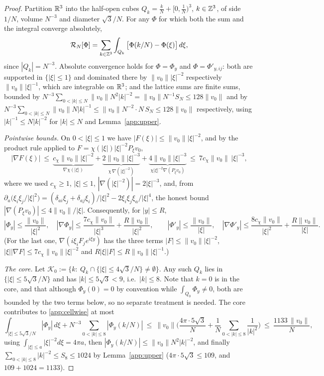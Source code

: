 \begin{proof}
Partition $\mathbb R^3$ into the half-open cubes
$Q_k=\frac kN+[0,\frac1N)^3$, $k\in\mathbb Z^3$, of side $1/N$, volume
$N^{-3}$ and diameter $\sqrt3/N$. For any $\Phi$ for which both the sum
and the integral converge absolutely,
\begin{equation}\label{app:cellwise}
\mathcal R_N[\Phi]=\sum_{k\in\mathbb Z^3}\int_{Q_k}
\big[\Phi(k/N)-\Phi(\xi)\big]\,d\xi ,
\end{equation}
since $|Q_k|=N^{-3}$. Absolute convergence holds for
$\Phi=\Phi_y$ and $\Phi=\Phi'_{y,ij}$: both are supported in
$\{|\xi|\le1\}$ and dominated there by $\|v_0\||\xi|^{-2}$ respectively
$\|v_0\||\xi|^{-1}$, which are integrable on $\mathbb R^3$; and the lattice
sums are finite sums, bounded by
$N^{-3}\sum_{0<|k|\le N}\|v_0\|N^{2}|k|^{-2}
=\|v_0\|N^{-1}S_N\le128\|v_0\|$ and by
$N^{-3}\sum_{0<|k|\le N}\|v_0\|N|k|^{-1}
\le\|v_0\|N^{-2}\cdot N\,S_N\le128\|v_0\|$ respectively, using
$|k|^{-1}\le N|k|^{-2}$ for $|k|\le N$ and Lemma~\ref{app:upper}.

\emph{Pointwise bounds.} On $0<|\xi|\le1$ we have
$|F(\xi)|\le\|v_0\||\xi|^{-2}$, and by the product rule applied to
$F=\chi(|\xi|)|\xi|^{-2}P_\xi v_0$,
\[
|\nabla F(\xi)|\ \le\
\underbrace{c_\chi\|v_0\||\xi|^{-2}}_{\nabla\chi(|\xi|)}
+\underbrace{2\|v_0\||\xi|^{-3}}_{\chi\,\nabla(|\xi|^{-2})}
+\underbrace{4\|v_0\||\xi|^{-3}}_{\chi|\xi|^{-2}\nabla(P_\xi v_0)}
\ \le\ 7c_\chi\|v_0\|\,|\xi|^{-3},
\]
where we used $c_\chi\ge1$, $|\xi|\le1$, $|\nabla(|\xi|^{-2})|
=2|\xi|^{-3}$, and, from
$\partial_a\big(\xi_i\xi_j/|\xi|^2\big)
=(\delta_{ai}\xi_j+\delta_{aj}\xi_i)/|\xi|^2
-2\xi_i\xi_j\xi_a/|\xi|^4$, the honest bound
$|\nabla(P_\xi v_0)|\le4\|v_0\|/|\xi|$. Consequently, for $|y|\le R$,
\begin{equation}\label{app:phibounds}
|\Phi_y|\le\frac{\|v_0\|}{|\xi|^{2}},\quad
|\nabla\Phi_y|\le\frac{7c_\chi\|v_0\|}{|\xi|^{3}}+\frac{R\|v_0\|}{|\xi|^{2}},
\qquad
|\Phi'_y|\le\frac{\|v_0\|}{|\xi|},\quad
|\nabla\Phi'_y|\le\frac{8c_\chi\|v_0\|}{|\xi|^{2}}+\frac{R\|v_0\|}{|\xi|} .
\end{equation}
(For the last one, $\nabla(i\xi_iF_je^{i\xi y})$ has the three terms
$|F|\le\|v_0\||\xi|^{-2}$, $|\xi||\nabla F|\le7c_\chi\|v_0\||\xi|^{-2}$
and $R|\xi||F|\le R\|v_0\||\xi|^{-1}$.)

\emph{The core.} Let
$\mathcal K_0:=\{k:\ Q_k\cap\{|\xi|\le4\sqrt3/N\}\neq\emptyset\}$. Any
such $Q_k$ lies in $\{|\xi|\le5\sqrt3/N\}$ and has $|k|\le5\sqrt3<9$,
i.e.\ $|k|\le8$. Note that $k=0$ is in the core, and that although
$\Phi_y(0)=0$ by convention while $\int_{Q_0}\Phi_y\neq0$, both are
bounded by the two terms below, so no separate treatment is needed. The
core contributes to \eqref{app:cellwise} at most
\[
\int_{|\xi|\le5\sqrt3/N}|\Phi_y|\,d\xi
+N^{-3}\!\!\sum_{0<|k|\le8}\!|\Phi_y(k/N)|
\ \le\ \|v_0\|\Big(\frac{4\pi\cdot5\sqrt3}{N}
+\frac1N\!\!\sum_{0<|k|\le8}\!\frac1{|k|^{2}}\Big)
\ \le\ \frac{1133\,\|v_0\|}{N},
\]
using $\int_{|\xi|\le a}|\xi|^{-2}d\xi=4\pi a$, then
$|\Phi_y(k/N)|\le\|v_0\|N^2|k|^{-2}$, and finally
$\sum_{0<|k|\le8}|k|^{-2}\le S_8\le1024$ by Lemma~\ref{app:upper}
($4\pi\cdot5\sqrt3\le109$, and $109+1024=1133$).


\end{proof}
